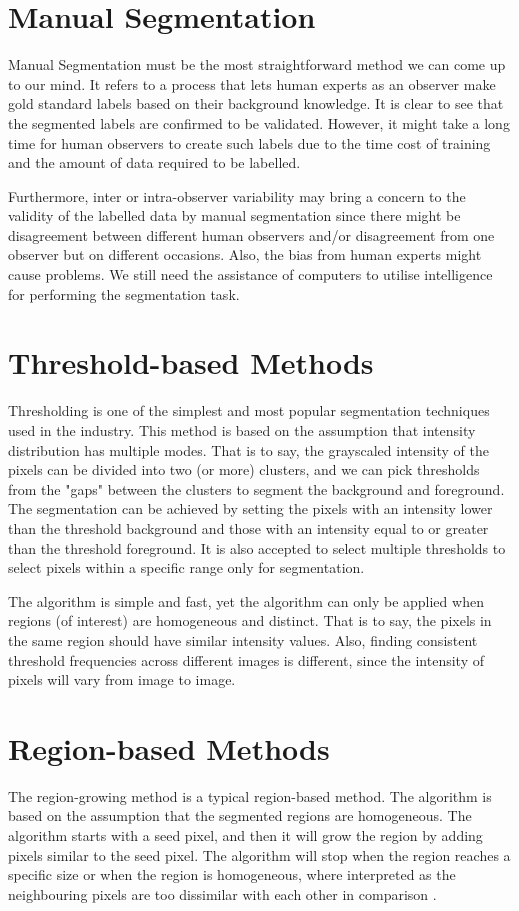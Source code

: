 \section{Manual Segmentation}

Manual Segmentation must be the most straightforward method we can come up to our mind. It refers to a process that lets human experts as an observer make gold standard labels based on their background knowledge. It is clear to see that the segmented labels are confirmed to be validated. However, it might take a long time for human observers to create such labels due to the time cost of training and the amount of data required to be labelled. \medskip

\noindent Furthermore, inter or intra-observer variability may bring a concern to the validity of the labelled data by manual segmentation since there might be disagreement between different human observers and/or disagreement from one observer but on different occasions. Also, the bias from human experts might cause problems. We still need the assistance of computers to utilise intelligence for performing the segmentation task. 

\section{Threshold-based Methods}

Thresholding is one of the simplest and most popular segmentation techniques used in the industry. This method is based on the assumption that intensity distribution has multiple modes. That is to say, the grayscaled intensity of the pixels can be divided into two (or more) clusters, and we can pick thresholds from the "gaps" between the clusters to segment the background and foreground. The segmentation can be achieved by setting the pixels with an intensity lower than the threshold background and those with an intensity equal to or greater than the threshold foreground. It is also accepted to select multiple thresholds to select pixels within a specific range only for segmentation. \medskip

\noindent The algorithm is simple and fast, yet the algorithm can only be applied when regions (of interest) are homogeneous and distinct. That is to say, the pixels in the same region should have similar intensity values. Also, finding consistent threshold frequencies across different images is different, since the intensity of pixels will vary from image to image.
\section{Region-based Methods}
The region-growing method is a typical region-based method. The algorithm is based on the assumption that the segmented regions are homogeneous. The algorithm starts with a seed pixel, and then it will grow the region by adding pixels similar to the seed pixel. The algorithm will stop when the region reaches a specific size or when the region is homogeneous, where interpreted as the neighbouring pixels are too dissimilar with each other in comparison \cite{adams1994seeded}. \medskip

